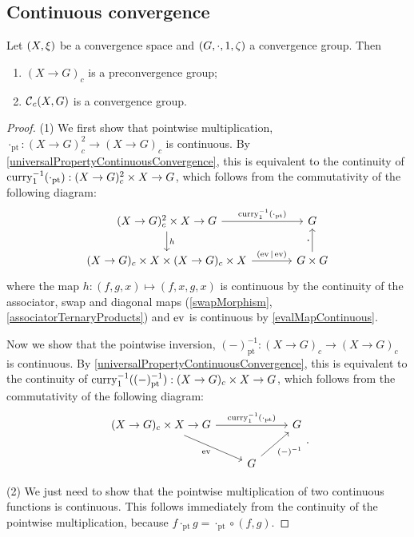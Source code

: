 \subsection{Continuous convergence}
\begin{proposition} \label{continuousConvergenceGroup}
Let $\sSet{X,\xi}$ be a convergence space and $\sSet{G, \cdot, 1, \zeta}$ a convergence group. Then
\begin{enumerate}
\item $(X\to G)_c$ is a preconvergence group;
\item $\operatorname{\mathcal{C}}_c(X,G)$ is a convergence group.
\end{enumerate}
\end{proposition}
\begin{proof}
(1) We first show that pointwise multiplication, $\cdot_\text{pt}: (X\to G)_c^2 \to (X\to G)_c$ is continuous. By \ref{universalPropertyContinuousConvergence}, this is equivalent to the continuity of $\operatorname{curry}_1^{-1}(\cdot_\text{pt}): (X\to G)_c^2\times X \to G$, which follows from the commutativity of the following diagram:
\[ \begin{tikzcd}[column sep=large]
(X\to G)_c^2\times X \to G \arrow[r, "{\curry_1^{-1}(\cdot_\text{pt})}"] \arrow[d, "h"] & G \\
(X\to G)_c\times X \times (X\to G)_c \times X \arrow[r, "(\evalMap|\evalMap)"] & G\times G \arrow[u, "{\boldsymbol{\cdot}}"]
\end{tikzcd} \]
where the map $h: (f,g,x) \mapsto (f,x,g,x)$ is continuous by the continuity of the associator, swap and diagonal maps (\ref{swapMorphism}, \ref{associatorTernaryProducts}) and $\operatorname{ev}$ is continuous by \ref{evalMapContinuous}.

Now we show that the pointwise inversion, $(-)^{-1}_\text{pt}: (X\to G)_c \to (X\to G)_c$ is continuous. By \ref{universalPropertyContinuousConvergence}, this is equivalent to the continuity of $\operatorname{curry}_1^{-1}((-)^{-1}_\text{pt}): (X\to G)_c\times X \to G$, which follows from the commutativity of the following diagram:
\[ \begin{tikzcd}
(X\to G)_c\times X \to G \arrow[rr, "{\curry_1^{-1}(\cdot_\text{pt})}"] \arrow[dr, swap, "\evalMap"] & {} & G \\
{} & G \arrow[ur, swap, "{(-)^{-1}}"] & {}
\end{tikzcd}. \]

(2) We just need to show that the pointwise multiplication of two continuous functions is continuous. This follows immediately from the continuity of the pointwise multiplication, because $f\cdot_\text{pt} g = \cdot_\text{pt}\circ (f,g)$.
\end{proof}

